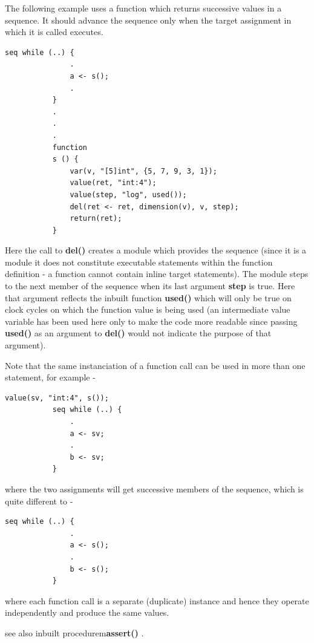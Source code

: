         The following example uses a function which returns successive values
        in a sequence. It should advance the sequence only when the target
        assignment in which it is called executes.
        \begin{lstlisting}[gobble=8, language=threepl]
           seq while (..) {
               .
               a <- s();
               .
           }
           .
           .
           .
           function
           s () {
               var(v, "[5]int", {5, 7, 9, 3, 1});
               value(ret, "int:4");
               value(step, "log", used());
               del(ret <- ret, dimension(v), v, step);
               return(ret);
           }
        \end{lstlisting}
        Here the call to {\bf del()} creates a module which provides the
        sequence (since it is a module it does not constitute executable
        statements within the function definition - a function cannot contain
        inline target statements). The module steps to the next member of the
        sequence when its last argument {\bf step} is true. Here that argument
        reflects the inbuilt function {\bf used()} which will only be true on
        clock cycles on which the function value is being used (an intermediate
        value variable has been used here only to make the code more readable
        since passing {\bf used()} as an argument to {\bf del()} would
        not indicate the purpose of that argument).
        
        Note that the same instanciation of a function call can be used
        in more than one statement, for example -
        \begin{lstlisting}[gobble=8, language=threepl]
           value(sv, "int:4", s());
           seq while (..) {
               .
               a <- sv;
               .
               b <- sv;
           }
        \end{lstlisting}
        where the two assignments will get successive members of the sequence,
        which is quite different to -
        \begin{lstlisting}[gobble=8, language=threepl]
           seq while (..) {
               .
               a <- s();
               .
               b <- s();
           }
        \end{lstlisting}
        where each function call is a separate (duplicate) instance and hence
        they operate independently and produce the same values.
        
        see also inbuilt procedurem{\bf assert()} .


